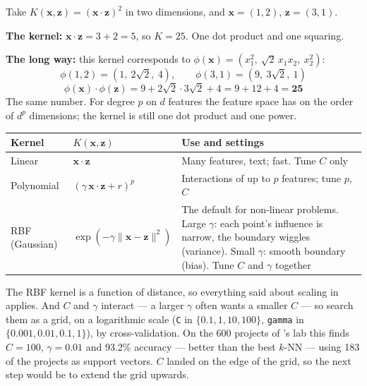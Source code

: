 \begin{worked}
Take $K(\mathbf{x}, \mathbf{z}) = (\mathbf{x}\cdot\mathbf{z})^2$ in two dimensions, and
$\mathbf{x} = (1, 2)$, $\mathbf{z} = (3, 1)$.

\smallskip
\textbf{The kernel:} $\mathbf{x}\cdot\mathbf{z} = 3 + 2 = 5$, so $K = 25$. One dot product
and one squaring.

\textbf{The long way:} this kernel corresponds to
$\phi(\mathbf{x}) = (x_1^2,\ \sqrt{2}\,x_1 x_2,\ x_2^2)$:
\[
\phi(1,2) = (1,\ 2\sqrt{2},\ 4), \qquad \phi(3,1) = (9,\ 3\sqrt{2},\ 1)
\]
\[
\phi(\mathbf{x})\cdot\phi(\mathbf{z}) = 9 + 2\sqrt{2}\cdot 3\sqrt{2} + 4 = 9 + 12 + 4 = \mathbf{25}
\]
The same number. For degree $p$ on $d$ features the feature space has on the order of
$d^p$ dimensions; the kernel is still one dot product and one power.
\end{worked}

\begin{longtable}{@{}L{3.0cm}L{4.4cm}L{7.6cm}@{}}
\toprule
{}
\textbf{Kernel} & \textbf{$K(\mathbf{x}, \mathbf{z})$} & \textbf{Use and settings} \\
\midrule
\endhead
Linear & $\mathbf{x}\cdot\mathbf{z}$ & Many features, text; fast. Tune $C$ only \\
Polynomial & $(\gamma\,\mathbf{x}\cdot\mathbf{z} + r)^p$ & Interactions of up to $p$
features; tune $p$, $C$ \\
RBF (Gaussian) & $\exp(-\gamma\|\mathbf{x} - \mathbf{z}\|^2)$ & The default for
non-linear problems. Large $\gamma$: each point's influence is narrow, the boundary
wiggles (variance). Small $\gamma$: smooth boundary (bias). Tune $C$ and $\gamma$
together \\
\bottomrule
\end{longtable}

\begin{alertbox}
The RBF kernel is a function of distance, so everything said about scaling in
 applies. And $C$ and $\gamma$ interact --- a larger $\gamma$ often wants a
smaller $C$ --- so search them as a grid, on a logarithmic scale
(\texttt{C} in $\{0.1, 1, 10, 100\}$, \texttt{gamma} in $\{0.001, 0.01, 0.1, 1\}$),
by cross-validation. On the 600 projects of 's lab this finds $C = 100$,
$\gamma = 0.01$ and 93.2\% accuracy --- better than the best $k$-NN --- using 183
of the projects as support vectors. $C$ landed on the edge of the grid, so the
next step would be to extend the grid upwards.
\end{alertbox}

